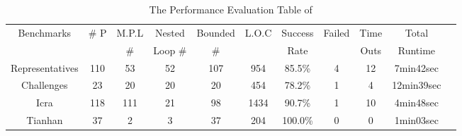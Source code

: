 
\begin{table}[H]
    \vspace{-0.3cm}    
    \caption{The Performance Evaluation Table of {\PSRB}}
    \label{tb:performance-eval}
    \vspace{-0.3cm}    
    \centering
    {\scriptsize
    \begin{tabular}{ | c | c | c | c | c | c | c | c | c | c | c |}
    \hline
    \hline
    \multirow{2}{*}{Benchmarks} & \multirow{2}{*}{\# P}  & {M.P.L} & Nested  & {Bounded} 
    & \multirow{2}{*}{L.O.C} & {Success} & \multirow{2}{*}{Failed} & Time  & Total
    \\
    &  & \# & Loop \# & \# & & Rate &  & Outs &   Runtime \\
    \hline
    \hline 
    {Representatives} & {110}  & 53  & 52  & 107 & 954 & 85.5\% & 4 & 12 & 7min42sec \\
    \hline
    Challenges & 23  & 20 & 20 & {20} & 454 & {78.2\%}  & 1 & 4 & {12min39sec} \\
    \hline
    {Icra} & 118 & 111 & 21 & 98 & 1434  & 90.7\% & 1 & 10 & {4min48sec} \\
    \hline
    Tianhan & 37 & 2 & 3 & 37 & 204 & 100.0\% & 0 & 0 & 1min03sec \\
    \hline
    \hline
    \end{tabular}    
    }
    \vspace{-0.3cm}    
    \end{table}